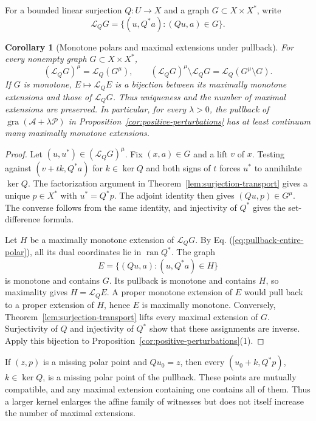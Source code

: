 \documentclass[11pt]{article}
\newcommand{\gra}{\operatorname{gra}}
\newtheorem{corollary}{Corollary}
\theoremstyle{definition}
\theoremstyle{remark}
\begin{document}
For a bounded linear surjection $Q:U\to X$ and a graph $G\subset X\times X^*$, write
\[
\mathcal L_QG=\{(u,Q^*a):(Qu,a)\in G\}.
\]

\begin{corollary}[Monotone polars and maximal extensions under pullback]
\label{cor:pullback-extensions}
For every nonempty graph $G\subset X\times X^*$,
\begin{equation}
(\mathcal L_QG)^\mu=\mathcal L_Q(G^\mu),\qquad
(\mathcal L_QG)^\mu\setminus\mathcal L_QG=\mathcal L_Q(G^\mu\setminus G).
\label{eq:pullback-entire-polar}
\end{equation}
If $G$ is monotone, $E\mapsto\mathcal L_QE$ is a bijection between its maximally monotone extensions and those of $\mathcal L_QG$. Thus uniqueness and the number of maximal extensions are preserved. In particular, for every $\lambda>0$, the pullback of $\gra(\mathcal A+\lambda\mathcal P)$ in Proposition~\ref{cor:positive-perturbations} has at least continuum many maximally monotone extensions.
\end{corollary}
\begin{proof}
Let $(u,u^*)\in(\mathcal L_QG)^\mu$. Fix $(x,a)\in G$ and a lift $v$ of $x$. Testing against $(v+tk,Q^*a)$ for $k\in\ker Q$ and both signs of $t$ forces $u^*$ to annihilate $\ker Q$. The factorization argument in Theorem~\ref{lem:surjection-transport} gives a unique $p\in X^*$ with $u^*=Q^*p$. The adjoint identity then gives $(Qu,p)\in G^\mu$. The converse follows from the same identity, and injectivity of $Q^*$ gives the set-difference formula.

Let $H$ be a maximally monotone extension of $\mathcal L_QG$. By Eq. (\ref{eq:pullback-entire-polar}), all its dual coordinates lie in $\operatorname{ran}Q^*$. The graph
\[
E=\{(Qu,a):(u,Q^*a)\in H\}
\]
is monotone and contains $G$. Its pullback is monotone and contains $H$, so maximality gives $H=\mathcal L_QE$. A proper monotone extension of $E$ would pull back to a proper extension of $H$, hence $E$ is maximally monotone. Conversely, Theorem~\ref{lem:surjection-transport} lifts every maximal extension of $G$. Surjectivity of $Q$ and injectivity of $Q^*$ show that these assignments are inverse. Apply this bijection to Proposition~\ref{cor:positive-perturbations}(1).
\end{proof}

If $(z,p)$ is a missing polar point and $Qu_0=z$, then every $(u_0+k,Q^*p)$, $k\in\ker Q$, is a missing polar point of the pullback. These points are mutually compatible, and any maximal extension containing one contains all of them. Thus a larger kernel enlarges the affine family of witnesses but does not itself increase the number of maximal extensions.
\end{document}
